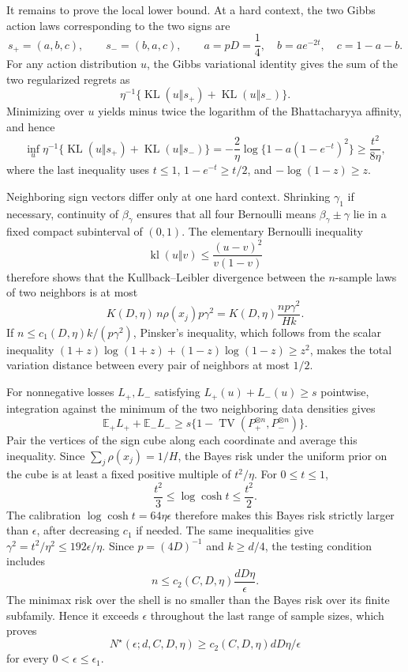 It remains to prove the local lower bound. At a hard context, the two Gibbs action laws corresponding to the two signs are
\[
s_+=(a,b,c),\qquad s_-=(b,a,c),\qquad a=pD=\frac14,\quad b=ae^{-2t},\quad c=1-a-b.
\]
For any action distribution \(u\), the Gibbs variational identity gives the sum of the two regularized regrets as
\[
\eta^{-1}\{\operatorname{KL}(u\Vert s_+)+\operatorname{KL}(u\Vert s_-)\}.
\]
Minimizing over \(u\) yields minus twice the logarithm of the Bhattacharyya affinity, and hence
\[
\inf_u\eta^{-1}\{\operatorname{KL}(u\Vert s_+)+\operatorname{KL}(u\Vert s_-)\}
=-\frac2\eta\log\{1-a(1-e^{-t})^2\}
\ge \frac{t^2}{8\eta},
\]
where the last inequality uses \(t\le1\), \(1-e^{-t}\ge t/2\), and \(-\log(1-z)\ge z\).

Neighboring sign vectors differ only at one hard context. Shrinking \(\gamma_1\) if necessary, continuity of \(\beta_\gamma\) ensures that all four Bernoulli means \(\beta_\gamma\pm\gamma\) lie in a fixed compact subinterval of \((0,1)\). The elementary Bernoulli inequality
\[
\operatorname{kl}(u\Vert v)\le\frac{(u-v)^2}{v(1-v)}
\]
therefore shows that the Kullback--Leibler divergence between the \(n\)-sample laws of two neighbors is at most
\[
K(D,\eta)\,n\rho(x_j)p\gamma^2
=K(D,\eta)\frac{np\gamma^2}{Hk}.
\]
If \(n\le c_1(D,\eta)k/(p\gamma^2)\), Pinsker's inequality, which follows from the scalar inequality \((1+z)\log(1+z)+(1-z)\log(1-z)\ge z^2\), makes the total variation distance between every pair of neighbors at most \(1/2\).

For nonnegative losses \(L_+,L_-\) satisfying \(L_+(u)+L_-(u)\ge s\) pointwise, integration against the minimum of the two neighboring data densities gives
\[
\mathbb E_+L_++\mathbb E_-L_-\ge s\{1-\operatorname{TV}(P_+^{\otimes n},P_-^{\otimes n})\}.
\]
Pair the vertices of the sign cube along each coordinate and average this inequality. Since \(\sum_j\rho(x_j)=1/H\), the Bayes risk under the uniform prior on the cube is at least a fixed positive multiple of \(t^2/\eta\). For \(0\le t\le1\),
\[
\frac{t^2}{3}\le\log\cosh t\le\frac{t^2}{2}.
\]
The calibration \(\log\cosh t=64\eta\epsilon\) therefore makes this Bayes risk strictly larger than \(\epsilon\), after decreasing \(c_1\) if needed. The same inequalities give \(\gamma^2=t^2/\eta^2\le192\epsilon/\eta\). Since \(p=(4D)^{-1}\) and \(k\ge d/4\), the testing condition includes
\[
n\le c_2(C,D,\eta)\frac{dD\eta}{\epsilon}.
\]
The minimax risk over the shell is no smaller than the Bayes risk over its finite subfamily. Hence it exceeds \(\epsilon\) throughout the last range of sample sizes, which proves
\[
N^\star(\epsilon;d,C,D,\eta)\ge c_2(C,D,\eta)dD\eta/\epsilon
\]
for every \(0<\epsilon\le\epsilon_1\).